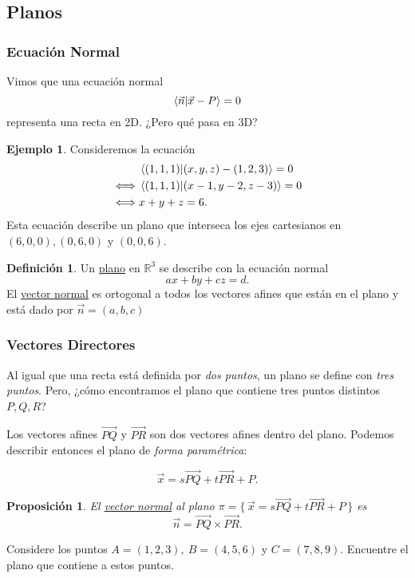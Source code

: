 \documentclass[12pt]{article}
\theoremstyle{plain}
\newtheorem{Prop}[Th]{Proposición}     %
\theoremstyle{definition}
\newtheorem*{Def}{Definición}       %
\newtheorem{Ex}[Th]{Ejemplo}           %
\theoremstyle{remark}
\newcommand{\bR}{\mathbb{R}}        %
\newcommand{\x}{\times}             %
\renewcommand{\:}{\colon}           %
\newcommand{\un}[1]{\underline{#1}}
\renewcommand{\.}{\Cdot}                %
\newcommand{\vaf}{\overrightarrow}
\newcommand{\set}[1]{\{\,#1\,\}}    %
\begin{document}
\begin{multicols}{2}
\subsection*{Planos}

\subsubsection*{Ecuación Normal}

Vimos que una ecuación normal 
$$\braket{\vec{n}}{\vec{x}-P}=0$$
representa una recta en 2D. ¿Pero qué pasa en 3D?

\begin{Ex}
  Consideremos la ecuación \begin{align*}
    &\braket{(1,1,1)}{(x,y,z)-(1,2,3)}=0\\
    \iff&\braket{(1,1,1)}{(x-1,y-2,z-3)}=0\\
    \iff&x+y+z=6.
  \end{align*}
  Esta ecuación describe un plano que interseca los ejes cartesianos en $(6,0,0),(0,6,0)$ y $(0,0,6)$.
\end{Ex}

\begin{Def}
Un \un{plano} en $\bR^3$ se describe con la ecuación normal 
$$ax+by+cz=d.$$
El \un{vector normal} es ortogonal a todos los vectores afines que están en el plano y está dado por $\vec{n}=(a,b,c)$
\end{Def}

\subsubsection*{Vectores Directores}

Al igual que una recta está definida por \emph{dos puntos}, un plano se define con \emph{tres puntos}. Pero, ¿cómo encontramos el plano que contiene tres puntos distintos $P,Q,R$?\par 
Los vectores afines $\overrightarrow{PQ}$ y $\overrightarrow{PR}$ son dos vectores afines dentro del plano. Podemos describir entonces el plano de \emph{forma paramétrica}:

$$\vec{x}=s\vaf{PQ}+t\vaf{PR}+P.$$

\begin{Prop}
El \un{vector normal} al plano $\pi=\set{\vec{x}=s\vaf{PQ}+t\vaf{PR}+P}$ es 
$$\vec{n}=\vaf{PQ}\x\vaf{PR}.$$
\end{Prop}

\begin{ptcbP}
Considere los puntos $A=(1,2,3),\ B=(4,5,6)$ y $C=(7,8,9)$. Encuentre el plano que contiene a estos puntos.
\end{ptcbP}


\end{multicols}
\end{document}
